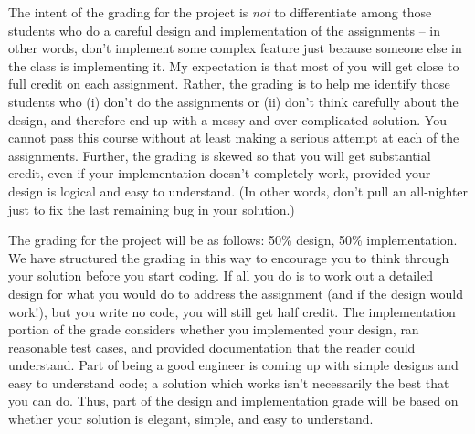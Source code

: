 The intent of the grading for the project is {\em not} to differentiate 
among those students who do a careful design and implementation
of the assignments -- in other words, don't implement some complex
feature just because someone else in the class is implementing it.
My expectation is that most of you will get close to full credit on 
each assignment.  Rather, the grading is to help me identify those 
students who (i) don't do the assignments or (ii) don't think carefully
about the design, and therefore end up with a messy and over-complicated
solution.  You cannot pass this course without at least making a 
serious attempt at each of the assignments.
Further, the grading is skewed so that you will get substantial credit,
even if your implementation doesn't completely work, provided your
design is logical and easy to understand.  (In other words, don't
pull an all-nighter just to fix the last remaining bug in your solution.)

The grading for the project will be as follows: 50\% design, 50\% 
implementation. We have structured the grading in this way
to encourage you to think through your solution before you start
coding.   If all you do is to work out a detailed design for what
you would do to address the assignment (and if the design would work!), but 
you write no code, you will still get half credit.  The implementation portion 
of the grade considers whether you implemented your design, ran reasonable
test cases, and provided documentation that the reader could understand.
Part of being a good engineer is coming up with simple designs and easy 
to understand code; a solution which works isn't necessarily the best that
you can do.  Thus, part of the design and implementation grade
will be based on whether your solution is elegant, simple, and 
easy to understand.

